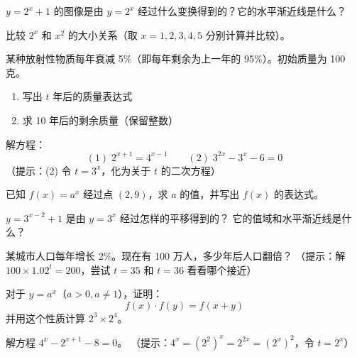 \begin{exercise}[3]
\(y = 2^x + 1\) 的图像是由 \(y = 2^x\) 经过什么变换得到的？它的水平渐近线是什么？
\end{exercise}

\begin{exercise}[3]
比较 \(2^x\) 和 \(x^2\) 的大小关系（取 \(x = 1, 2, 3, 4, 5\) 分别计算并比较）。
\end{exercise}

\begin{exercise}[3]
某种放射性物质每年衰减 5\%（即每年剩余为上一年的 95\%）。初始质量为 100 克。
\begin{enumerate}
  \item[(1)] 写出 \(t\) 年后的质量表达式
  \item[(2)] 求 10 年后的剩余质量（保留整数）
\end{enumerate}
\end{exercise}


\begin{exercise}[4]
解方程：
\[
(1)\; 2^{x+1} = 4^{x-1} \qquad (2)\; 3^{2x} - 3^x - 6 = 0
\]
（提示：(2) 令 \(t = 3^x\)，化为关于 \(t\) 的二次方程）
\end{exercise}

\begin{exercise}[4]
已知 \(f(x) = a^x\) 经过点 \((2, 9)\)，求 \(a\) 的值，并写出 \(f(x)\) 的表达式。
\end{exercise}

\begin{exercise}[4]
\(y = 3^{x-2} + 1\) 是由 \(y = 3^x\) 经过怎样的平移得到的？
它的值域和水平渐近线是什么？
\end{exercise}

\begin{exercise}[4]
某城市人口每年增长 2\%。现在有 100 万人，多少年后人口翻倍？
（提示：解 \(100 \times 1.02^t = 200\)，尝试 \(t = 35\) 和 \(t = 36\) 看看哪个接近）
\end{exercise}

\begin{exercise}[4]
对于 \(y = a^x\)（\(a > 0, a \neq 1\)），证明：
\[
f(x) \cdot f(y) = f(x + y)
\]
并用这个性质计算 \(2^3 \times 2^4\)。
\end{exercise}


\begin{exercise}[5]
解方程 \(4^x - 2^{x+1} - 8 = 0\)。
（提示：\(4^x = (2^2)^x = 2^{2x} = (2^x)^2\)，令 \(t = 2^x\)）
\end{exercise}

